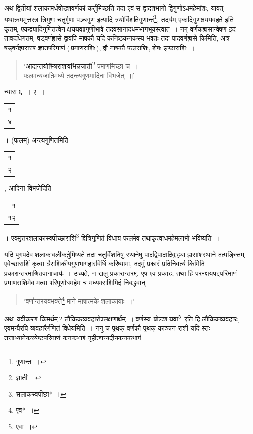 \documentclass[10pt, openany]{book}
\begin{document}
{{{अथ द्वितीयां शलाकामर्धषोडशवर्णकां कर्तुमिच्छति तदा एवं स द्वादशभागो
द्विगुणोऽधमहेमांशः, यावत् यथाक्रममुत्तरत्र त्रिगुणः चतुर्गुणः पञ्चगुण इत्यादि
त्रयोविंशतिगुणान्तं\renewcommand{\thefootnote}{\s ४}\footnote{\s *गुणान्तः~।},}
{तदर्थम् एकादिगुणक्षययवहते इति कृतम्, एकद्व्यादिगुणितत्वेन
क्षययवप्रगुणीभावे तदवसानादधमभागभूयस्त्वात्~। ननु वर्णकह्रासान्वेषण इदं तावदधिगतम्, षड्वर्णह्रासे
द्वावपि माषकौ}
{यदि कनिष्ठकनकस्य भवतः तदा पादवर्णह्रासे किमिति, अत्र षड्वर्णह्रासस्य
ज्ञातपरिमाणं}
{(\,प्रमाणराशिः\,), द्वौ माषकौ फलराशिः, शेषः इच्छाराशिः~।}

\begin{quote}
    
\hyperref[43]{'आद्यन्तयोस्त्रिराशावभिन्नजाती\renewcommand{\thefootnote}{\s ५}\footnote{\s *ज्ञाती~।} प्रमाणमिच्छा च~। \\
 फलमन्यजातिमध्ये तदन्त्यगुणमादिना विभजेत्~॥'}\end{quote}

{न्यासः\textendash \,६~। २~।\begin{tabular}{r}१\\ ४\end{tabular}। (फलम्) अन्त्यगुणितमिति\begin{tabular}{r}१ \\२\end{tabular}, आदिना विभजेदिति\begin{tabular}{r}१\\
१२\end{tabular}।
एवमुत्तरशलाकास्वपीच्छाराशिं\renewcommand{\thefootnote}{\s ६}\footnote{\s *सलाकस्वपीछा*~।} द्वित्रिगुणितं विधाय फलमेव
तथाकृत्वाधमहेमलाभो भविष्यति~।}
{यदि युगपदेव शलाकावलीकर्तुमिष्यते तदा चतुर्विंशतिषु स्थानेषु
पादद्विपादादिवृद्ध्या}
{ह्रासांशस्थाने तत्पङ्क्तिम् एवेच्छाराशिं कृत्वा त्रैराशिकीयगुणभागहारविधिं
करिष्यामः, तदमुं}
{प्रकारं प्रतिनिवर्त्य किमिति प्रकारान्तरमाश्रितवानाचार्यः~। उच्यते, न
खलु प्रकारान्तरम्,}
{एष एव प्रकारः; तथा हि परमक्षयषट्परिमाणं प्रमाणराशिमेव मत्वा
परिपूर्णाधमहेम च}
{मध्यमराशिमिदं निबद्धवान्\textemdash}

\begin{quote}{\qt 'वर्णान्तरयवभक्ते\renewcommand{\thefootnote}{\s ७}\footnote{\s *एव*~।} माने माषात्मके शलाकायाः~।'}\end{quote}

\vspace{3mm}

{अथ \,यवीकरणं किमर्थम्\,? लौकिकव्यवहारोपलक्षणार्थम्~। वर्णस्य \,षोडश यवा\renewcommand{\thefootnote}{\s ८}\footnote{\s एवा~।} \,इति हि}
{लौकिकव्यवहारः, एवमन्यैरपि व्यवहारैर्गणितं विधेयमिति~। ननु च पृथक्
वर्णकौ पृथक्}
{काञ्चन-राशी यदि स्तः तत्ताभ्यामेकस्येष्टपरिमाणं कनकभागं
गृहीत्वान्यदीयकनकभागं}

}}
\end{document}
